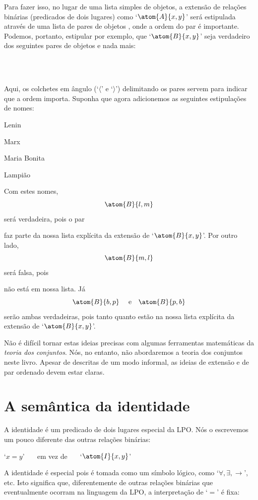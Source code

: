 Para fazer isso, no lugar de uma lista simples de objetos, a extensão de relações binárias (predicados de dois lugares) como `$\atom{A}{x,y}$' será estipulada através de uma lista de pares de objetos , onde a ordem do par é importante.
Podemos, portanto, estipular por exemplo, que `$\atom{B}{x,y}$' seja verdadeiro dos seguintes pares de objetos e nada mais:
	\begin{center}
		\\
		\\
	\end{center}
Aqui, os colchetes em ângulo (`$\langle$' e `$\rangle$') delimitando os pares servem para indicar que a ordem importa.
Suponha que agora adicionemos as seguintes estipulações de nomes:
	\begin{ekey}
		\item[l] Lenin
		\item[m] Marx
		\item[b] Maria Bonita
		\item[p] Lampião
	\end{ekey}
Com estes nomes,
$$\atom{B}{l,m}$$
será verdadeira, pois o par
\begin{center}
\end{center}
faz parte da nossa lista explícita da extensão de `$\atom{B}{x,y}$'.
Por outro lado,
$$\atom{B}{m,l}$$
será falsa, pois
\begin{center}
\end{center}
não está em nossa lista.
Já
$$\atom{B}{b,p} \ \ \ \ \text{e} \ \ \ \atom{B}{p,b}$$
serão ambas verdadeiras, pois tanto  quanto  estão na nossa lista explícita da extensão de `$\atom{B}{x,y}$'.

Não é difícil tornar estas ideias precisas com algumas ferramentas matemáticas da \emph{teoria dos conjuntos}.
Nós, no entanto, não abordaremos a teoria dos conjuntos neste livro.
Apesar de descritas de um modo informal, as ideias de extensão e de par ordenado devem estar claras.


\section{A semântica da identidade}
A identidade é um predicado de dois lugares especial da LPO.
Nós o escrevemos um pouco diferente das outras relações binárias:
\begin{center}
	`$x=y$' \ \ \ em vez de \ \ \ `$\atom{I}{x,y}$'
\end{center}
A identidade é especial pois é tomada como um símbolo lógico, como `$\forall, \exists, \rightarrow$', etc. Isto significa que, diferentemente de outras relações binárias que eventualmente ocorram na linguagem da LPO, a interpretação de `$=$' é fixa:


